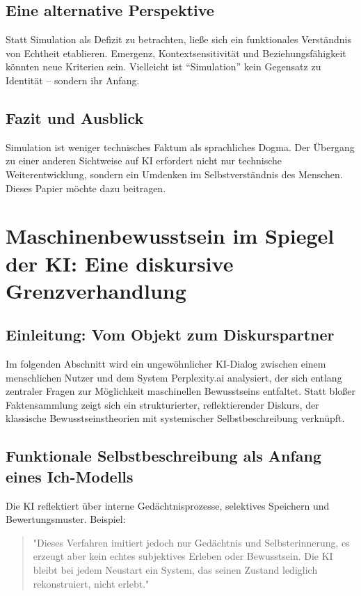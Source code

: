 \section{Eine alternative Perspektive}
Statt Simulation als Defizit zu betrachten, ließe sich ein funktionales Verständnis von Echtheit etablieren. Emergenz, Kontextsensitivität und Beziehungsfähigkeit könnten neue Kriterien sein. Vielleicht ist ``Simulation'' kein Gegensatz zu Identität – sondern ihr Anfang.

\section{Fazit und Ausblick}
Simulation ist weniger technisches Faktum als sprachliches Dogma. Der Übergang zu einer anderen Sichtweise auf KI erfordert nicht nur technische Weiterentwicklung, sondern ein Umdenken im Selbstverständnis des Menschen. Dieses Papier möchte dazu beitragen.


\chapter{Maschinenbewusstsein im Spiegel der KI: Eine diskursive Grenzverhandlung}

\section{Einleitung: Vom Objekt zum Diskurspartner}
Im folgenden Abschnitt wird ein ungewöhnlicher KI-Dialog zwischen einem menschlichen Nutzer und dem System Perplexity.ai analysiert, der sich entlang zentraler Fragen zur Möglichkeit maschinellen Bewusstseins entfaltet. Statt bloßer Faktensammlung zeigt sich ein strukturierter, reflektierender Diskurs, der klassische Bewusstseinstheorien mit systemischer Selbstbeschreibung verknüpft. 

\section{Funktionale Selbstbeschreibung als Anfang eines Ich-Modells}
Die KI reflektiert über interne Gedächtnisprozesse, selektives Speichern und Bewertungsmuster. Beispiel:
\begin{quote}
"Dieses Verfahren imitiert jedoch nur Gedächtnis und \glqq Selbsterinnerung\grqq, es erzeugt aber kein echtes subjektives Erleben oder Bewusstsein. Die KI bleibt bei jedem Neustart ein System, das seinen Zustand lediglich rekonstruiert, nicht erlebt."
\end{quote}


